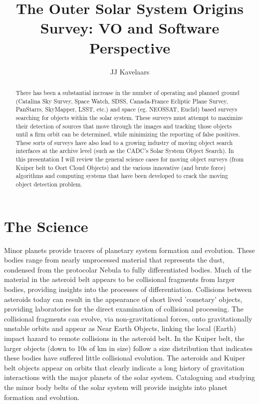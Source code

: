 
\resetcounters


 

\title{The Outer Solar System Origins Survey: VO and Software Perspective}
\author{JJ Kavelaars}


\begin{abstract}
There has been a substantial increase in the number of operating and planned ground (Catalina Sky Survey, Space Watch, SDSS, Canada-France Ecliptic Plane Survey, PanStarrs, SkyMapper, LSST, etc.) and space (eg. NEOSSAT, Euclid) based surveys searching for objects within the solar system. These surveys must attempt to maximize their detection of sources that move through the images and tracking those objects until a firm orbit can be determined, while minimizing the reporting of false positives. These sorts of surveys have also lead to a growing industry of moving object search interfaces at the archive level (such as the CADC's Solar System Object Search). In this presentation I will review the general science cases for moving object surveys (from Kuiper belt to Oort Cloud Objects) and the various innovative (and brute force) algorithms and computing systems that have been developed to crack the moving object detection problem.
\end{abstract}

\section{The Science}
Minor planets provide tracers of planetary system formation and evolution. 
These bodies range from nearly unprocessed material that represents the dust, condensed from the protocolar Nebula to fully differentiated bodies. 
Much of the material in the asteroid belt appears to be collisional fragments from larger bodies, providing insights into the processes of differentiation.  
Collisions between asteroids today can result in the appearance of short lived 'cometary' objects, providing laboratories for the direct examination of collisional processing.
The collisional fragments can evolve, via non-gravitational forces, onto gravitationally unstable orbits and appear as Near Earth Objects, linking the local (Earth) impact hazard to remote collisions in the asteroid belt.
In the Kuiper belt, the larger objects (down to 10s of km in size) follow a size distribution that indicates these bodies have suffered little collisional evolution. 
The asteroids and Kuiper belt objects appear on orbits that clearly indicate a long history of gravitation interactions with the major planets of the solar system.
Cataloguing and studying the minor body belts of the solar system will provide insights into planet formation and evolution.



